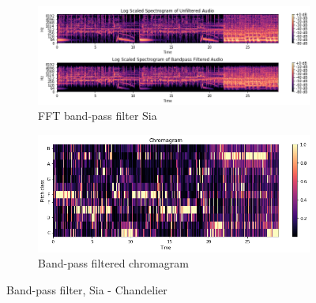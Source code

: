 \begin{figure}[htbp]
{{			\begin{subfigure}{.495\textwidth}
				\centering
				\includegraphics[scale=0.3]{Images/Chroma/siafft.png}
				\caption{FFT band-pass filter Sia}
				\label{siafft}
			\end{subfigure}%
			\begin{subfigure}{.495\textwidth}
				\centering
				\includegraphics[scale=0.3]{Images/Chroma/chroma_bp.png}
				\caption{Band-pass filtered chromagram}
				\label{pvfft}
			\end{subfigure}%
	}}
	\caption{Band-pass filter, Sia - Chandelier}
	\label{fig:sia2}
\end{figure}

